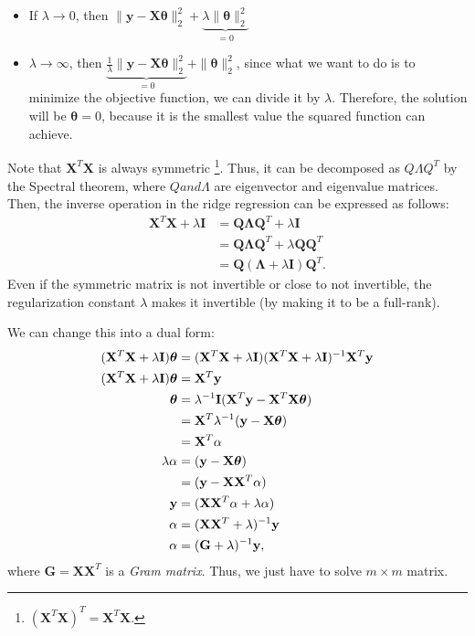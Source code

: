 \begin{itemize}
	\item If $\lambda\to 0$, then $\|\mathbf{y}-\mathbf{X}\boldsymbol{\theta}\|^2_2 + \underbrace{\lambda \|\boldsymbol{\theta}\|^2_2}_{=0}$ 
	\item $\lambda\to \infty$, then $\underbrace{\frac{1}{\lambda}\|\mathbf{y}-\mathbf{X}\boldsymbol{\theta}\|^2_2}_{=0} + \|\boldsymbol{\theta}\|^2_2$, since what we want to do is to minimize the objective function, we can divide it by $\lambda$. Therefore, the solution will be $\boldsymbol{\theta}=0$, because it is the smallest value the squared function can achieve. 
\end{itemize}
Note that $\mathbf{X}^T\mathbf{X}$ is always symmetric \footnote{$(\mathbf{X}^T\mathbf{X})^T = \mathbf{X}^T\mathbf{X}$.}. Thus, it can be decomposed as $Q\Lambda Q^T$ by the Spectral theorem, where $Q and \Lambda$ are eigenvector and eigenvalue matrices. Then, the inverse operation in the ridge regression can be expressed as follows:
\begin{align*}
	\mathbf{X}^T\mathbf{X}+\lambda\mathbf{I} &= \mathbf{Q}\mathbf{\Lambda}\mathbf{Q}^T+\lambda\mathbf{I}\\
											 &= \mathbf{Q}\mathbf{\Lambda}\mathbf{Q}^T+\lambda\mathbf{Q}\mathbf{Q}^T\\
											 &= \mathbf{Q}(\mathbf{\Lambda}+\lambda\mathbf{I})\mathbf{Q}^T.
\end{align*}
Even if the symmetric matrix is not invertible or close to not invertible, the regularization constant $\lambda$ makes it invertible (by making it to be a full-rank). 

We can change this into a dual form:
\begin{align}
	(\mathbf{X}^T\mathbf{X}+\lambda\mathbf{I})\boldsymbol{\theta}	&= (\mathbf{X}^T\mathbf{X}+\lambda\mathbf{I})(\mathbf{X}^T\mathbf{X}+\lambda\mathbf{I})^{-1}\mathbf{X}^T{\mathbf{y}}\\
	(\mathbf{X}^T\mathbf{X}+\lambda\mathbf{I})\boldsymbol{\theta} &= \mathbf{X}^T{\mathbf{y}}\\ 
	\boldsymbol{\theta} &= \lambda^{-1}\mathbf{I}(\mathbf{X}^T{\mathbf{y}}-\mathbf{X}^T\mathbf{X}\boldsymbol{\theta})\\
	&= \mathbf{X}^T\lambda^{-1}({\mathbf{y}}-\mathbf{X}\boldsymbol{\theta})\\
	&= \mathbf{X}^T\alpha\\
	\lambda\alpha &= ({\mathbf{y}}-\mathbf{X}\boldsymbol{\theta})\\
	&= ({\mathbf{y}}-\mathbf{X}\mathbf{X}^T\alpha)\\
	{\mathbf{y}} &= (\mathbf{X}\mathbf{X}^T\alpha+\lambda\alpha)\\
	\alpha &= (\mathbf{X}\mathbf{X}^T+\lambda)^{-1}{\mathbf{y}}\\
	\alpha &= (\mathbf{G}+\lambda)^{-1}{\mathbf{y}},
	\label{eq:dual_regression}
\end{align}
where $\mathbf{G} = \mathbf{X}\mathbf{X}^T$ is a \textit{Gram matrix}. Thus, we just have to solve $m\times m$ matrix. 




